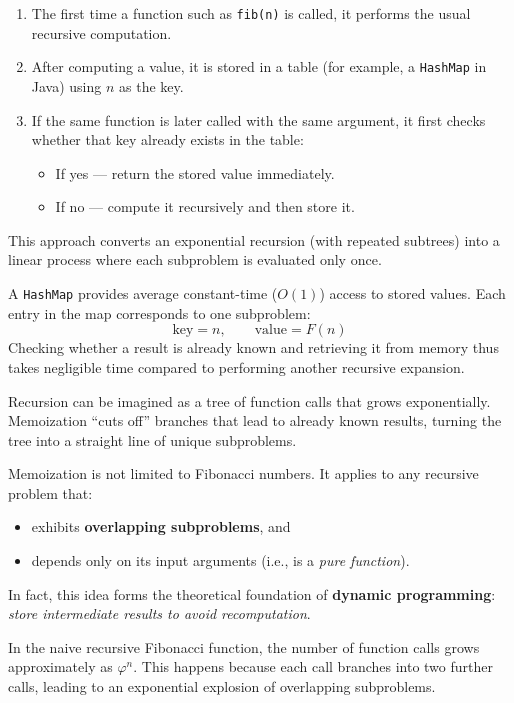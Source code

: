 \documentclass{article}
\begin{document}
\begin{enumerate}
	\item The first time a function such as \texttt{fib(n)} is called, it performs the usual recursive computation.
	\item After computing a value, it is stored in a table (for example, a \texttt{HashMap} in Java) using $n$ as the key.
	\item If the same function is later called with the same argument, it first checks whether that key already exists in the table:
	\begin{itemize}
		\item If yes --- return the stored value immediately.
		\item If no --- compute it recursively and then store it.
	\end{itemize}
\end{enumerate}

This approach converts an exponential recursion (with repeated subtrees) into a linear process where each subproblem is evaluated only once.

A \texttt{HashMap} provides average constant-time ($O(1)$) access to stored values.
Each entry in the map corresponds to one subproblem:
\[
	\text{key} = n, \qquad \text{value} = F(n)
\]
Checking whether a result is already known and retrieving it from memory thus takes negligible time compared to performing another recursive expansion.

Recursion can be imagined as a tree of function calls that grows exponentially.
Memoization ``cuts off'' branches that lead to already known results,
turning the tree into a straight line of unique subproblems.

Memoization is not limited to Fibonacci numbers.
It applies to any recursive problem that:
\begin{itemize}
	\item exhibits \textbf{overlapping subproblems}, and
	\item depends only on its input arguments (i.e., is a \emph{pure function}).
\end{itemize}

In fact, this idea forms the theoretical foundation of \textbf{dynamic programming}:
\emph{store intermediate results to avoid recomputation}.


In the naive recursive Fibonacci function, the number of function calls grows approximately as $\varphi^n$.
This happens because each call branches into two further calls, leading to an exponential explosion of overlapping subproblems.
\end{document}
